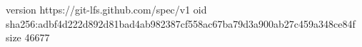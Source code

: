 version https://git-lfs.github.com/spec/v1
oid sha256:adbf4d222d892d81bad4ab982387cf558ac67ba79d3a900ab27c459a348ce84f
size 46677
